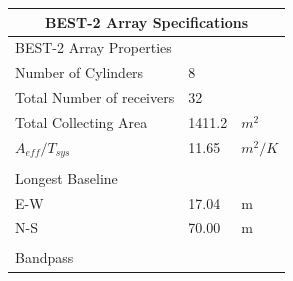 \documentclass[useAMS,macros,usenatbib,onecolumn]{mn2e}
\begin{document}
\begin{table}
\begin{center}
\begin{tabular}{| l | l | l |}
\hline
\multicolumn{3}{|c|}{BEST-2 Array Specifications}\\
\hline
BEST-2 Array Properties		&            &            	\\
\hline
Number of Cylinders 		&          8 &            	\\
Total Number of receivers 		&         32 &            	\\
Total Collecting Area 		&     1411.2 &        $m^2$ 	\\
$A_{eff}/T_{sys}$ 		&      11.65 &      $m^2/K$ 	\\
				&            &            	\\
\hline
Longest Baseline 		&            &            	\\
\hline
E-W 				&      17.04 &         m 	\\
N-S 				&      70.00 &         m 	\\
				&            &            	\\
\hline
Bandpass        		&            &       		\\

\end{tabular}
\end{center}
\end{table}
\end{document}

